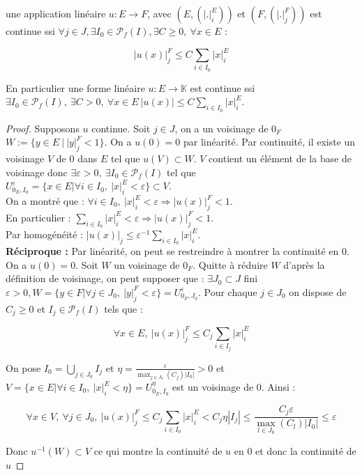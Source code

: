 \begin{proposition}
   une application linéaire $u:E\to F$, avec $(E, (|.|_i^E))$ et $(F,(|.|_j^F))$ est continue ssi $\forall j\in J, \exists I_0 \in \mathcal{P}_f(I), \exists C \geq  0,\ \forall x\in E$ : 
   
   $$ |u(x)|_j^F \le C \sum\limits_{i\in I_0} |x|_i^E$$
\end{proposition}

En particulier une forme linéaire $u:E\to \mathbb{K} $ est continue ssi $\exists I_0 \in \mathcal{P}_f(I),\ \exists C > 0,\ \forall x\in E\ |u(x)|\le C \sum\limits_{i\in I_0} |x|_i^E$.

\begin{proof}
   Supposons $u$ continue. Soit $j\in J$, on a un voisinage de $0_F$ \\$W:=\{y\in E\ |\ |y|_j^F<1\} $. 
   On a $u(0)=0$ par linéarité. Par continuité, il existe un voisinage $V$ de 0 dans $E$ tel que $u(V)\subset W$.
   $V$ contient un élément de la base de voisinage donc $\exists \varepsilon >0,\ \exists I_0 \in \mathcal{P}_f(I)$ tel que $U_{0_E,I_0}^\varepsilon = \{x\in E|\forall i\in I_0,\ |x|_i^E<\varepsilon  \} \subset V$.\\
   On a montré que : $\forall i\in I_0,\ |x|_i^E <\varepsilon \Rightarrow |u(x)|_j^F<1$. \\
   En particulier : $\sum\limits_{i\in I_0} |x|_i^E<\varepsilon \Rightarrow |u(x)|_j^F < 1 $.\\
   Par homogénéité : $|u(x)|_j \le \varepsilon ^{-1} \sum\limits_{i\in I_0} |x|_i^E$.\\
   
   \textbf{Réciproque :} Par linéarité, on peut se restreindre à montrer la continuité en $0$.\\
   On a $u(0)=0$. Soit $W$ un voisinage de $0_F$. Quitte à réduire $W$ d'après la définition de voisinage, on peut supposer que : $\exists J_0\subset J$ fini $\varepsilon >0, W=\{y\in F|\forall j\in J_0,\ |y|_j^F<\varepsilon  \} = U_{0_F,J_0}^\varepsilon$. Pour chaque $j\in J_0$ on dispose de $C_j \geq 0$ et $I_j \in \mathcal{P}_f(I)$ tels que :  
   
   $$\forall x \in E, ~ |u(x)|_j^F\le C_j \sum_{i\in I_j} |x|_i^E$$
   
   On pose $I_0=\bigcup_{j\in J_0}I_j$ et $\eta=\frac{\varepsilon}{\max_{j \in J_0} (C_j) |I_0|}>0$ et $V=\{x\in E|\forall i\in I_0,\ |x|_i^E<\eta \}=U_{0_E,I_0}^\eta$ est un voisinage de 0. Ainsi :
   
   $$\forall x\in V,\ \forall j\in J_0,\ |u(x)|_j^F\le C_j \sum\limits_{i\in I_0} |x|_i^E<C_j\eta|I_j|\le \frac{C_j \varepsilon}{\max_{l \in J_0} (C_l) |I_0|} \le \varepsilon $$

   Donc $u^{-1}(W) \subset V$ ce qui montre la continuité de $u$ en $0$ et donc la continuité de $u$
\end{proof}

